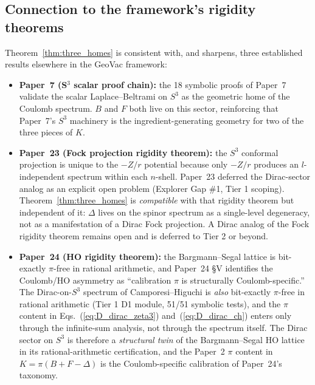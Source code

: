\subsection{Connection to the framework's rigidity theorems}\label{sec:rigidity_connection}

Theorem~\ref{thm:three_homes} is consistent with, and sharpens, three
established results elsewhere in the GeoVac framework:

\begin{itemize}
  \item \textbf{Paper~7 (S$^{3}$ scalar proof chain):} the 18 symbolic
    proofs of Paper~7 validate the scalar Laplace--Beltrami on $S^{3}$
    as the geometric home of the Coulomb spectrum. $B$ and $F$ both
    live on this sector, reinforcing that Paper~7's $S^{3}$ machinery
    is the ingredient-generating geometry for two of the three pieces
    of $K$.
  \item \textbf{Paper~23 (Fock projection rigidity theorem):} the $S^{3}$
    conformal projection is unique to the $-Z/r$ potential because only
    $-Z/r$ produces an $l$-independent spectrum within each $n$-shell.
    Paper~23 deferred the Dirac-sector analog as an explicit open
    problem (Explorer Gap \#1, Tier 1 scoping). Theorem~\ref{thm:three_homes}
    is \emph{compatible} with that rigidity theorem but independent of
    it: $\Delta$ lives on the spinor spectrum as a single-level
    degeneracy, not as a manifestation of a Dirac Fock projection.
    A Dirac analog of the Fock rigidity theorem remains open and is
    deferred to Tier 2 or beyond.
  \item \textbf{Paper~24 (HO rigidity theorem):} the Bargmann--Segal
    lattice is bit-exactly $\pi$-free in rational arithmetic, and
    Paper~24 \S V identifies the Coulomb/HO asymmetry as ``calibration
    $\pi$ is structurally Coulomb-specific.'' The Dirac-on-$S^{3}$
    spectrum of Camporesi--Higuchi is \emph{also} bit-exactly $\pi$-free
    in rational arithmetic (Tier 1 D1 module, 51/51 symbolic tests),
    and the $\pi$ content in Eqs.~(\ref{eq:D_dirac_zeta3})
    and~(\ref{eq:D_dirac_ch}) enters only through the infinite-sum
    analysis, not through the spectrum itself. The Dirac sector on
    $S^{3}$ is therefore a \emph{structural twin} of the
    Bargmann--Segal HO lattice in its rational-arithmetic certification,
    and the Paper~2 $\pi$ content in $K = \pi(B + F - \Delta)$ is the
    Coulomb-specific calibration of Paper~24's taxonomy.
\end{itemize}

